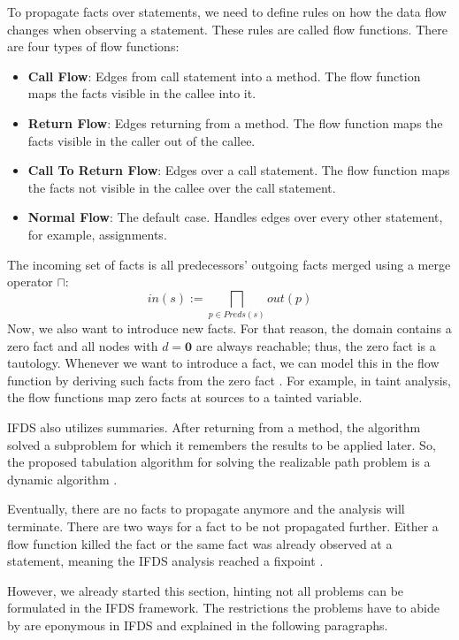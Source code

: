\documentclass[../draft.tex]{subfiles}
\begin{document}
    To propagate facts over statements, we need to define rules on how the data flow changes when observing a statement. 
    These rules are called flow functions. 
    There are four types of flow functions: \cite{Reps1995}
    \begin{itemize}
        \item \textbf{Call Flow}: Edges from call statement into a method. The flow function maps the facts visible in the callee into it. 
        \item \textbf{Return Flow}: Edges returning from a method. The flow function maps the facts visible in the caller out of the callee.
        \item \textbf{Call To Return Flow}: Edges over a call statement. The flow function maps the facts not visible in the callee over the call statement.
        \item \textbf{Normal Flow}: The default case. Handles edges over every other statement, for example, assignments.
    \end{itemize}
    The incoming set of facts is all predecessors' outgoing facts merged using a merge operator $\sqcap$: 
    $$
        in(s) := \bigsqcap_{p \in Preds(s)} out(p)
    $$
    Now, we also want to introduce new facts. 
    For that reason, the domain contains a zero fact and all nodes with $d=\textbf{0}$ are always reachable; thus, the zero fact is a tautology. 
    Whenever we want to introduce a fact, we can model this in the flow function by deriving such facts from the zero fact  \cite{Reps1995}. 
    For example, in taint analysis, the flow functions map zero facts at sources to a tainted variable. 

    IFDS also utilizes summaries. 
    After returning from a method, the algorithm solved a subproblem for which it remembers the results to be applied later. 
    So, the proposed tabulation algorithm for solving the realizable path problem is a dynamic algorithm \cite{Reps1995}. 

    Eventually, there are no facts to propagate anymore and the analysis will terminate.
    There are two ways for a fact to be not propagated further.
    Either a flow function killed the fact or the same fact was already observed at a statement, meaning the IFDS analysis reached a fixpoint \cite{Reps1995}.

    However, we already started this section, hinting not all problems can be formulated in the IFDS framework. 
    The restrictions the problems have to abide by are eponymous in IFDS and explained in the following paragraphs.
\end{document}
